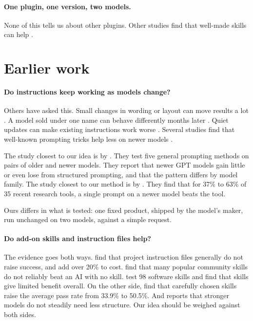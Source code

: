 \documentclass[11pt]{article}
\begin{document}
\paragraph{One plugin, one version, two models.} None of this tells us about other plugins. Other studies find that well-made skills can help \citep{li2026skillsbench}.

\section{Earlier work}
\label{sec:related}

\paragraph{Do instructions keep working as models change?} Others have asked this. Small changes in wording or layout can move results a lot \citep{sclar2023sensitivity}. A model sold under one name can behave differently months later \citep{chen2023chatgpt}. Quiet updates can make existing instructions work worse \citep{ma2023regression}. Several studies find that well-known prompting tricks help less on newer models \citep{meincke2025cot,wang2024advanced}.

The study closest to our idea is by \citet{rudyk2026aging}. They test five general prompting methods on pairs of older and newer models. They report that newer GPT models gain little or even lose from structured prompting, and that the pattern differs by model family. The study closest to our method is by \citet{salsabil2026survives}. They find that for 37\% to 63\% of 35 recent research tools, a single prompt on a newer model beats the tool.

Ours differs in what is tested: one fixed product, shipped by the model's maker, run unchanged on two models, against a simple request.

\paragraph{Do add-on skills and instruction files help?} The evidence goes both ways. \citet{gloaguen2026agentsmd} find that project instruction files generally do not raise success, and add over 20\% to cost. \citet{ying2026openskilleval} find that many popular community skills do not reliably beat an AI with no skill. \citet{han2026sweskills} test 98 software skills and find that skills give limited benefit overall. On the other side, \citet{li2026skillsbench} find that carefully chosen skills raise the average pass rate from 33.9\% to 50.5\%. And \citet{cho2026harness} reports that stronger models do not steadily need less structure. Our idea should be weighed against both sides.
\end{document}
